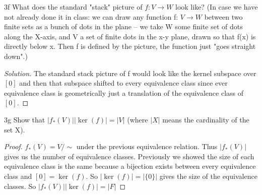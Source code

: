 \documentclass{article}
\newcommand{\abs}[1]{\lvert #1\rvert}
\newcommand{\rarr}[0]{\rightarrow}
\newenvironment{solution}
  {\renewcommand\qedsymbol{$\blacksquare$}\begin{proof}[Solution]}
  {\end{proof}}
\begin{document}
\begin{PROB}{3f}\label{Problem 3f.}
	What does the standard "stack" picture of $f: V \rarr W$ look like? (In case we have not already done it in class: we can draw any function f: $V \rarr W$ between two finite sets as a bunch of dots in the plane -- we take W some finite set of dots along the X-axis, and V a set of finite dots in the x-y plane, drawn so that f(x) is directly below x. Then f is defined by the picture, the function just "goes straight down".)  
\end{PROB}
\begin{solution}
	The standard stack picture of f would look like the kernel subspace over $[0]$ and then that subspace shifted to every equivalence class since ever equivalence class is geometrically just a translation of the equivalence class of $[0]$.
\end{solution}

\begin{PROB}{3g}\label{Problem 3g.}
	Show that $\abs{f_*(V)}\abs{\ker(f)} = \abs{V}$ (where $\abs{X}$ means the cardinality of the set X).
\end{PROB}
\begin{proof}
	$f_*(V) = V/\sim$ under the previous equivalence relation. Thus $\abs{f_*(V)}$ gives us the number of equivalence classes. Previously we showed the size of each equivalence class is the same because a bijection exists between every equivalence class and $[0] = \ker(f)$. So $\abs{\ker(f)} = \abs{\{0\}}$ gives the size of the equivalence classes. So $\abs{f_*(V)}\abs{\ker(f)} = \abs{F}$
\end{proof}

\bigskip
\end{document}
